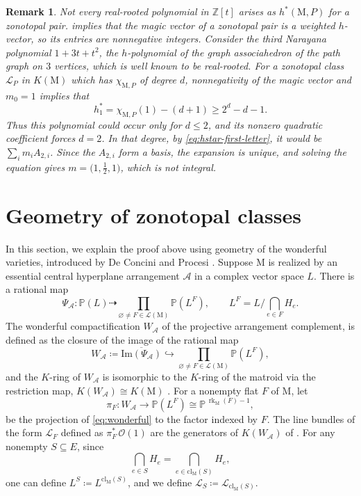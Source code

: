 \documentclass[11pt,a4paper,reqno]{amsart}
\theoremstyle{results}
\theoremstyle{definitions}
\newtheorem{remark}[thm]{Remark}
\def\Z{\mathbb{Z}}
\def\P{\mathbb{P}}
\def\Z{\mathbb{Z}}
\def\calA{\mathcal{A}}
\def\calL{\mathcal{L}}
\newcommand{\cl}{\textrm{cl}}
\renewcommand{\Im}{\textrm{Im}}
\newcommand{\rk}{\operatorname{rk}}
\newcommand{\M}{\mathrm{M}}
\renewcommand{\emptyset}{\varnothing}
\newcommand{\hstar}{h^{*}}
\newcommand{\cL}{\mathcal{L}}
\newcommand{\cO}{\mathcal{O}}
\begin{document}
\begin{remark}
Not every real-rooted polynomial in $\Z[t]$ arises as $h^{\ast}(\M, P)$ for a zonotopal pair.
 implies that the magic vector of a zonotopal pair is a
weighted $h$-vector, so its entries are nonnegative integers. Consider the
third Narayana polynomial $1 + 3t + t^2$, the $h$-polynomial of the graph
associahedron of the path graph on $3$ vertices, which is well known to be real-rooted.  For a zonotopal class $\cL_P$ in $K(\M)$ which has $\chi_{\M, P}$ of degree $d$, nonnegativity of the magic vector and
$m_0=1$ implies that
\[
  \hstar_1=\chi_{\M,P}(1)-(d+1)\geqslant2^d-d-1.
\]
Thus this polynomial could occur only for $d\leqslant2$, and its nonzero
quadratic coefficient forces $d=2$. In that degree, by
\eqref{eq:hstar-first-letter}, it would be $\sum_i m_i A_{2,i}$. Since the
$A_{2,i}$ form a basis, the expansion is unique, and solving the equation gives
$m = \big(1, \tfrac12, 1\big)$, which is not integral. 
\end{remark}

\section{Geometry of zonotopal classes}
\label{sec:geometry}
In this section, we explain the proof above using geometry of the wonderful varieties, introduced by De Concini and Procesi \cite{deconcini1995wonderful}.
Suppose $\M$ is realized by an essential central hyperplane arrangement
$\calA$ in a complex vector space $L$. There is a rational map
\[
\Psi_\calA \colon \P(L) \dashrightarrow \prod_{\emptyset \ne F \in \calL(\M)} \P(L^F), \qquad L^F = L/\bigcap_{e \in F} H_e.
\]
The wonderful compactification $W_{\calA}$ of the projective arrangement complement,
is defined as the closure of the image of the rational map
\begin{equation}\label{eq:wonderful}
W_{\calA} \coloneqq \overline{\Im(\Psi_{\calA})} \hookrightarrow \prod_{\emptyset \ne F \in \calL(\M)} \P(L^F),
\end{equation}
and the $K$-ring of $W_{\calA}$ is isomorphic to the $K$-ring of the matroid via the restriction map, $K(W_{\calA}) \cong K(\M)$ \cite[Proposition 1.13]{larson2024k}.
For a nonempty flat $F$ of $\M$, let
\[
  \pi_F \colon W_{\calA} \longrightarrow \P(L^F) \cong \P^{\,\rk_{\M}(F) - 1},
\]
be the projection of \eqref{eq:wonderful} to the factor indexed by $F$. The line bundles of the form $\cL_F$ defined as $\pi_F^{*}\,\cO(1)$ are the generators of $K(W_{\calA})$ of
.  For any nonempty $S \subseteq E$, since
\[
\bigcap_{e \in S} H_e = \bigcap_{e \in \cl_{\M}(S)} H_e,
\] one can define $L^S \coloneqq L^{\cl_{\M}(S)}$, and we define
$\cL_S \coloneqq \cL_{\cl_{\M}(S)}$.
\end{document}
